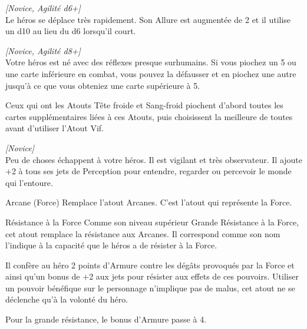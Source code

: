 \begin{description}[align=left]
    \item [Véloce]
    	\emph{[Novice, Agilité d6+]}\\
        Le héros se déplace très rapidement. Son Allure est augmentée de 2 et il utilise un d10 au lieu du d6 lorsqu’il court.

    \item [Vif]
    	\emph{[Novice, Agilité d8+]}\\
        Votre héros est né avec des réflexes presque surhumains. Si vous piochez un 5 ou une carte inférieure en combat, vous pouvez la défausser et en piochez une autre jusqu’à ce que vous obteniez une carte supérieure à 5. 

        Ceux qui ont les Atouts Tête froide et Sang-froid piochent d’abord toutes les cartes supplémentaires liées à ces Atouts, puis choisissent la meilleure de toutes avant d’utiliser l’Atout Vif.

    \item [Vigilant]
    	\emph{[Novice]}\\
        Peu de choses échappent à votre héros. Il est vigilant et très observateur. Il ajoute +2 à tous ses jets de Perception pour entendre, regarder ou percevoir le monde qui l’entoure.
\end{description}

\begin{paperbox}{Arcane (Force)}
    Remplace l’atout Arcanes. C’est l’atout qui représente la Force.
\end{paperbox}

\begin{paperbox}{Résistance à la Force}
    Comme son niveau supérieur Grande Résistance à la Force, cet atout remplace la résistance aux Arcanes. Il correspond comme son nom l’indique à la capacité que le héros a de résister à la Force.

    Il confère au héro 2 points d’Armure contre les dégâts provoqués par la Force et ainsi qu’un bonus de +2 aux jets pour résister aux effets de ces pouvoirs. Utiliser un pouvoir bénéfique sur le personnage n’implique pas de malus, cet atout ne se déclenche qu’à la volonté du héro.

    Pour la grande résistance, le bonus d’Armure passe à 4.
\end{paperbox}

\newpage
